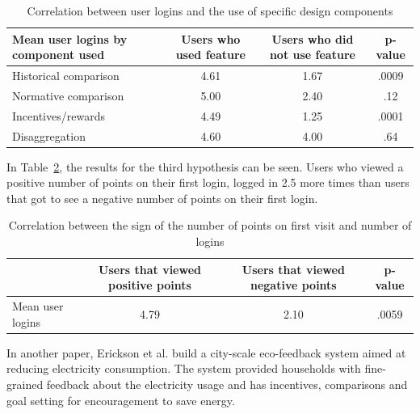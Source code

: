 \documentclass[journal]{vgtc}                %
\begin{document}
\begin{table}
  \caption{Correlation between user logins and the use of specific design components}
  \label{hypo2}
  \scriptsize
  \begin{center}
    \begin{tabular}{lccc}
    \multicolumn{1}{p{2.5cm}}{\centering Mean user logins by component used} &
       \multicolumn{1}{p{2cm}}{\centering Users who used feature} &
       \multicolumn{1}{p{2cm}}{\centering Users who did not use feature} &
       \multicolumn{1}{p{1cm}}{\centering p-value} \\
    \hline
      Historical comparison &  4.61 & 1.67 & .0009\\
      Normative comparison &  5.00 & 2.40 & .12\\
      Incentives/rewards &  4.49 & 1.25 & .0001\\
      Disaggregation &  4.60 & 4.00 & .64\\

    \end{tabular}
  \end{center}
\end{table}

In Table~\ref{hypo3}, the results for the third hypothesis can be seen. Users who viewed a positive number of points on their first login, logged in 2.5 more times than users that got to see a negative number of points on their first login. \\

\begin{table}
  \caption{Correlation between the sign of the number of points on first visit and number of logins}
  \label{hypo3}
  \scriptsize
  \begin{center}
    \begin{tabular}{lccc}
    \multicolumn{1}{p{2cm}}{\centering } &
       \multicolumn{1}{p{2cm}}{\centering Users that viewed positive points} &
       \multicolumn{1}{p{2cm}}{\centering Users that viewed negative points} &
       \multicolumn{1}{p{1cm}}{\centering p-value} \\
    \hline
      Mean user logins &  4.79 & 2.10 & .0059\\

    \end{tabular}
  \end{center}
\end{table}


In another paper, Erickson et al.\cite{erickson2013dubuque} build a city-scale eco-feedback system aimed at reducing electricity consumption. The system provided households with fine-grained feedback about the electricity usage and has incentives, comparisons and goal setting for encouragement to save energy. \\
\end{document}
